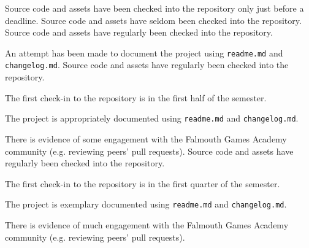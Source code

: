 \documentclass{../fal_assignment}
\begin{document}
\begin{markingrubric}
        \grade 		Source code and assets have been checked into the repository only just before a deadline.
        \grade 		Source code and assets have seldom been checked into the repository.
        \grade 		Source code and assets have regularly been checked into the repository.
        \par 		An attempt has been made to document the project using \texttt{readme.md} and \texttt{changelog.md}.
        \grade 		Source code and assets have regularly been checked into the repository.
        \par  		The first check-in to the repository is in the first half of the semester.
        \par 		The project is appropriately documented using \texttt{readme.md} and \texttt{changelog.md}.
        \par 		There is evidence of some engagement with the Falmouth Games Academy community (e.g. reviewing peers' pull requests).
        \grade 		Source code and assets have regularly been checked into the repository.
        \par  		The first check-in to the repository is in the first quarter of the semester.
        \par 		The project is exemplary documented using \texttt{readme.md} and \texttt{changelog.md}.
        \par 		There is evidence of much engagement with the Falmouth Games Academy community (e.g. reviewing peers' pull requests).
\end{markingrubric}
\end{document}
